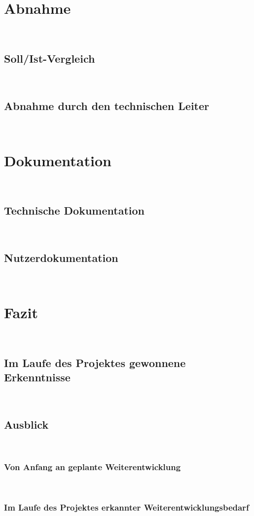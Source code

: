 \documentclass[11pt,toc=sectionentrywithoutdots, 
headheight=44pt, headings=optiontoheadandtoc, hyperfootnotes=false, hypertexnames=false]{scrartcl}
\begin{document}
\section{Abnahme}
\blindtext\

\subsection{Soll/Ist-Vergleich}
\blindtext\

\subsection{Abnahme durch den technischen Leiter}
\blindtext\

\section{Dokumentation}
\blindtext\

\subsection{Technische Dokumentation}
\blindtext\

\subsection{Nutzerdokumentation}
\blindtext\

\section{Fazit}
\blindtext\

\subsection{Im Laufe des Projektes gewonnene Erkenntnisse}
\blindtext\

\subsection{Ausblick}
\blindtext\

\subsubsection{Von Anfang an geplante Weiterentwicklung}
\blindtext\

\subsubsection{Im Laufe des Projektes erkannter Weiterentwicklungsbedarf}
\blindtext\
\end{document}
